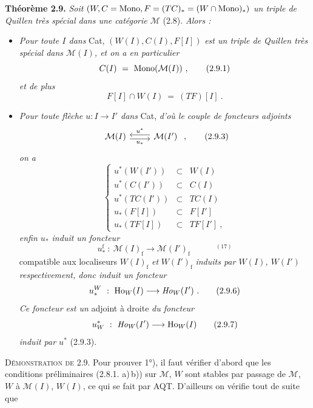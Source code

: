 \textbf{Théorème 2.9.} \textit{Soit} $(W, C = \mathrm{Mono}, F = (TC)_* = (W\cap\mathrm{Mono})_*)$ \textit{un triple de Quillen très spécial dans une catégorie $\mathcal{M}$} (2.8). \textit{Alors :}
\begin{itemize}[leftmargin=2.5em]
\item[1°)] \textit{Pour toute $I$ dans} Cat, $(W(I),C(I),F[I])$ \textit{est un triple de Quillen très spécial dans $\mathcal{M}(I)$, et on a en particulier}
\[ C(I) \ = \ \Mono(\mathcal{M}(I))\ , \tag*{(2.9.1)} \]
\textit{et de plus}
\[ F[I]\cap W(I) \ = \ (TF)[I]\ . \tag*{(2.9.2)} \]
\item[2°)] \textit{Pour toute flèche $u : I \longrightarrow I'$ dans} Cat, \textit{d'où le couple de foncteurs adjoints}
\[ \begin{tikzcd}
\mathcal{M}(I) \arrow[r, shift right, "u_*"'] & \mathcal{M}(I') \arrow[l, shift right, "u^*"']
\end{tikzcd}\ , \tag*{(2.9.3)} \]
\textit{on a}
\[ \left\{ \begin{array}{rcl}
u^*(W(I')) & \subset & W(I)\\
u^*(C(I')) & \subset & C(I)\\
u^*(TC(I')) & \subset & TC(I)\\
u_*(F[I]) & \subset & F[I']\\
u_*(TF[I]) & \subset & TF[I']\ ,
\end{array}\right. \tag*{(2.9.4)} \]
\textit{enfin $u_*$ induit un foncteur}
\[ u_*^{\mathrm{f}} \ :\ \mathcal{M}(I)_{\mathrm{f}} \longrightarrow \mathcal{M}(I')_{\mathrm{f}} \qquad\quad ^{(17)} \tag*{(2.9.5)} \]
compatible aux localiseurs $W(I)_{\mathrm{f}}$ \textit{et} $W(I')_{\mathrm{f}}$ \textit{induits par $W(I)$, $W(I')$ respectivement, donc induit un foncteur}
\[ u_*^W \ :\ \mathrm{Ho}_W(I) \longrightarrow \mathit{Ho}_W(I')\ . \tag*{(2.9.6)} \] %
\textit{Ce foncteur est un} adjoint à droite \textit{du foncteur}
\[ u_W^* \ :\ \mathit{Ho}_W(I') \longrightarrow \mathrm{Ho}_W(I) \tag*{(2.9.7)} \] %
\textit{induit par $u^*$} (2.9.3).
\end{itemize}
\textsc{Démonstration de 2.9.} Pour prouver 1°), il faut vérifier d'abord que les conditions préliminaires (2.8.1. a)\,b)) sur $\mathcal{M}$, $W$ sont stables par passage de $\mathcal{M}$, $W$ à $\mathcal{M}(I)$, $W(I)$, ce qui se fait par AQT. D'ailleurs on vérifie tout de suite que
